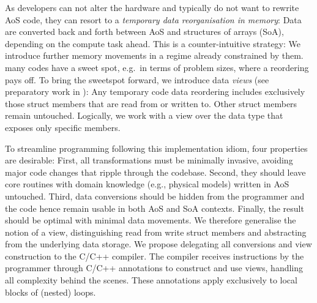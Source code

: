 %
%
As developers can not alter the hardware and typically do not want to rewrite AoS code, they can resort to a \emph{temporary data reorganisation in memory}:
Data are converted back and forth between AoS and structures of arrays (SoA), depending on the compute task ahead.
This is a counter-intuitive strategy:
We introduce further memory movements in a regime already constrained by them.
many codes have a sweet spot, e.g.~in terms of problem sizes, where a reordering pays off.
To bring the sweetspot forward, we introduce data \emph{views} (see preparatory work in \cite{Radtke:2024:AoS2SoA}): 
Any temporary code data reordering includes exclusively those struct members that are read from or written to.
Other struct members remain untouched. 
Logically, we work with a view over the data type that exposes only specific members.


%
%
To streamline programming following this implementation idiom, four properties are desirable: 
First, all transformations must be minimally invasive, avoiding major code changes that ripple through the codebase.
Second, they should leave core routines with domain knowledge (e.g., physical models) written in AoS untouched.
Third, data conversions should be hidden from the programmer and the code hence remain usable in both AoS and SoA contexts.
Finally, the result should be optimal with minimal data movements.
We therefore generalise the notion of a view, distinguishing read from write struct members and abstracting from the underlying data storage. 
We propose delegating all conversions and view construction to the C/C++ compiler. 
The compiler receives instructions by the programmer through C/C++ annotations to construct and use views, handling all complexity behind the scenes. 
These annotations apply exclusively to local blocks of (nested) loops.



